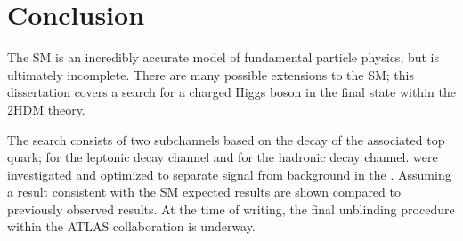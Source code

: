 \chapter{Conclusion}\label{chap:conclusions}
	The \acrlong{SM} is an incredibly accurate model of fundamental particle physics, but is ultimately incomplete. There are many possible extensions to the \acrlong{SM}; this dissertation covers a search for a charged Higgs boson in the \HpmLong final state within the \acrfull{2HDM} theory. 

	The search consists of two subchannels based on the decay of the associated top quark; \taulep for the leptonic decay channel and \taujets for the hadronic decay channel.  were investigated and optimized to separate signal from background in the . Assuming a result consistent with the \gls{SM} expected results are shown compared to previously observed results. At the time of writing, the final unblinding procedure within the \gls{ATLAS} collaboration is underway.